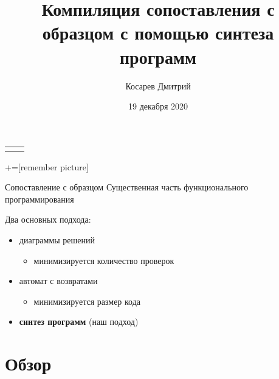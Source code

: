 \documentclass[aspectratio=169
  , xcolor={svgnames}
  , hyperref={ colorlinks,citecolor=Blue
             , linkcolor=DarkRed,urlcolor=DarkBlue}
  , russian
  ]{beamer}
\title[Компиляция сопоставления с образцом]{Компиляция сопоставления с образцом с помощью синтеза программ}
\date{19 декабря 2020}
\author{Косарев Дмитрий}
\institute[]{%
Лаборатория языковых инстументов \\
Миниконференция 2020}
\begin{document}
{
\begin{frame}[fragile]
  \begin{tabular}{p{5.5cm} p{5.5cm}}
   \begin{center}
    \end{center}
    &
    \begin{center}
    \end{center}
  \end{tabular}
  \titlepage
\end{frame}
}


+=[remember picture] 

\everymath{\displaystyle}
\begin{frame}{Сопоставление с образцом}
Существенная часть функционального программирования
\vspace{1cm}


Два основных подхода:
\begin{itemize}
\item диаграммы решений
\begin{itemize}
\item минимизируется количество проверок
\end{itemize}
\item автомат с возвратами
\begin{itemize}
\item минимизируется размер кода
\end{itemize}%
\item \textbf{синтез программ} (наш подход)
\end{itemize}
\end{frame}

\section{Обзор}
\end{document}
